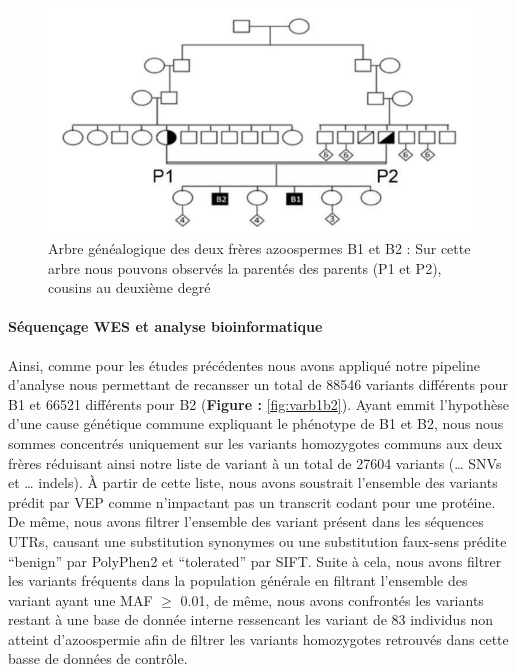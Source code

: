 \documentclass[12pt,twoside]{reedthesis}
\theoremstyle{definition}
\theoremstyle{definition}
\theoremstyle{remark}
\begin{document}
  \begin{figure}
  
  {\centering \includegraphics[scale=0.75]{figure/spink2_arbre_genealogique} 
  
  }
  
  \caption[Arbre généalogique des deux frères azoospermes B1 et B2]{Arbre généalogique des deux frères azoospermes B1 et B2 : Sur cette arbre nous pouvons observés la parentés des parents (P1 et P2), cousins au deuxième degré}\label{fig:spink2tree}
  \end{figure}
  
  \paragraph{Séquençage WES et analyse
  bioinformatique}\label{sequencage-wes-et-analyse-bioinformatique}
  
  Ainsi, comme pour les études précédentes nous avons appliqué notre
  pipeline d'analyse nous permettant de recansser un total de 88546
  variants différents pour B1 et 66521 différents pour B2 (\textbf{Figure
  : }\ref{fig:varb1b2}). Ayant emmit l'hypothèse d'une cause génétique
  commune expliquant le phénotype de B1 et B2, nous nous sommes concentrés
  uniquement sur les variants homozygotes communs aux deux frères
  réduisant ainsi notre liste de variant à un total de 27604 variants
  (\ldots{} SNVs et \ldots{} indels). À partir de cette liste, nous avons
  soustrait l'ensemble des variants prédit par VEP comme n'impactant pas
  un transcrit codant pour une protéine. De même, nous avons filtrer
  l'ensemble des variant présent dans les séquences UTRs, causant une
  substitution synonymes ou une substitution faux-sens prédite ``benign''
  par PolyPhen2 et ``tolerated'' par SIFT. Suite à cela, nous avons
  filtrer les variants fréquents dans la population générale en filtrant
  l'ensemble des variant ayant une MAF \(\ge\) 0.01, de même, nous avons
  confrontés les variants restant à une base de donnée interne ressencant
  les variant de 83 individus non atteint d'azoospermie afin de filtrer
  les variants homozygotes retrouvés dans cette basse de données de
  contrôle.
  
\end{document}
